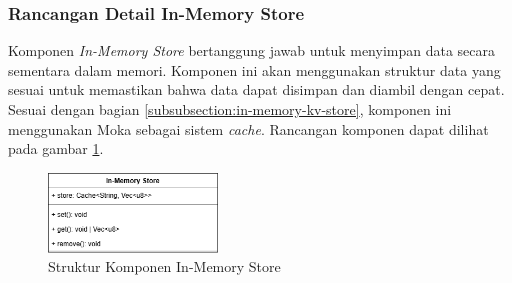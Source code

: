 \subsubsection{Rancangan Detail In-Memory Store}
\label{subsubsection:detail-in-memory-store}

Komponen \textit{In-Memory Store} bertanggung jawab untuk menyimpan data secara sementara dalam memori. Komponen ini akan menggunakan struktur data yang sesuai untuk memastikan bahwa data dapat disimpan dan diambil dengan cepat. Sesuai dengan bagian \ref{subsubsection:in-memory-kv-store}, komponen ini menggunakan Moka sebagai sistem \textit{cache}. Rancangan komponen dapat dilihat pada gambar \ref{fig:in-memory-store-component}.

\begin{figure}[ht]
    \centering
    \includegraphics[width=0.4\textwidth]{resources/chapter-3/in-memory-store-component.png}
    \caption{Struktur Komponen In-Memory Store}
    \label{fig:in-memory-store-component}
\end{figure}
